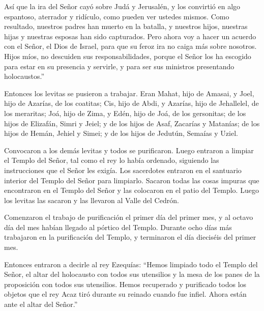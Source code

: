  Así que la ira del Señor cayó sobre Judá y Jerusalén, y los
convirtió en algo espantoso, aterrador y ridículo, como pueden ver
ustedes mismos.  Como resultado, nuestros padres han muerto
en la batalla, y nuestros hijos, nuestras hijas y nuestras esposas han
sido capturados.  Pero ahora voy a hacer un acuerdo con el
Señor, el Dios de Israel, para que su feroz ira no caiga más sobre
nosotros.  Hijos míos, no descuiden sus responsabilidades,
porque el Señor los ha escogido para estar en su presencia y servirle, y
para ser sus ministros presentando holocaustos.''

 Entonces los levitas se pusieron a trabajar. Eran Mahat,
hijo de Amasai, y Joel, hijo de Azarías, de los coatitas; Cis, hijo de
Abdi, y Azarías, hijo de Jehallelel, de los meraritas; Joá, hijo de
Zima, y Edén, hijo de Joá, de los gersonitas;  de los hijos
de Elizafán, Simri y Jeiel; y de los hijos de Asaf, Zacarías y Matanías;
 de los hijos de Hemán, Jehiel y Simei; y de los hijos de
Jedutún, Semaías y Uziel.

 Convocaron a los demás levitas y todos se purificaron.
Luego entraron a limpiar el Templo del Señor, tal como el rey lo había
ordenado, siguiendo las instrucciones que el Señor les exigía.
 Los sacerdotes entraron en el santuario interior del
Templo del Señor para limpiarlo. Sacaron todas las cosas impuras que
encontraron en el Templo del Señor y las colocaron en el patio del
Templo. Luego los levitas las sacaron y las llevaron al Valle del
Cedrón.

 Comenzaron el trabajo de purificación el primer día del
primer mes, y al octavo día del mes habían llegado al pórtico del
Templo. Durante ocho días más trabajaron en la purificación del Templo,
y terminaron el día dieciséis del primer mes.

 Entonces entraron a decirle al rey Ezequías: ``Hemos
limpiado todo el Templo del Señor, el altar del holocausto con todos sus
utensilios y la mesa de los panes de la proposición con todos sus
utensilios.  Hemos recuperado y purificado todos los
objetos que el rey Acaz tiró durante su reinado cuando fue infiel. Ahora
están ante el altar del Señor.''

